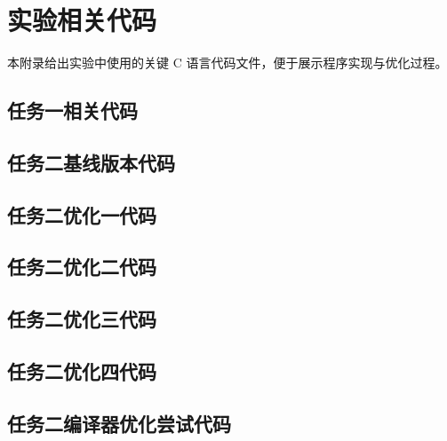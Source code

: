 \section{实验相关代码}

本附录给出实验中使用的关键 C 语言代码文件，便于展示程序实现与优化过程。
\subsection{任务一相关代码}


\subsection{任务二基线版本代码}


\subsection{任务二优化一代码}


\subsection{任务二优化二代码}


\subsection{任务二优化三代码}


\subsection{任务二优化四代码}


\subsection{任务二编译器优化尝试代码}
